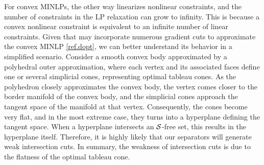For convex MINLPs, the other way linearizes nonlinear constraints, and the number of constraints in the LP relaxation can grow to infinity. This is because  a convex nonlinear constraint is equivalent to an infinite number of linear constraints.  Given that \scip may incorporate numerous gradient cuts to approximate the convex MINLP \eqref{ref.dopt}, we can better understand its behavior in a simplified scenario. Consider a smooth convex body approximated by a polyhedral outer approximation, where each vertex and its associated faces define one or several simplicial cones, representing optimal tableau cones. As the polyhedron closely approximates the convex body, the vertex comes closer to the border manifold of the convex body, and the simplicial cones approach the tangent space of the manifold at that vertex. Consequently, the cones become very flat, and in the most extreme case, they turns into a hyperplane defining the tangent space. When a hyperplane intersects an $\mathcal S$-free set, this results in the hyperplane itself. Therefore, it is highly likely that our separators will generate weak intersection cuts. In summary, the weakness of intersection cuts is due to the flatness of the optimal tableau cone.

\begin{table} [htbp]
\centering
{}
\caption{Summary of  \bdopt results}\label{gamma}
\end{table}

